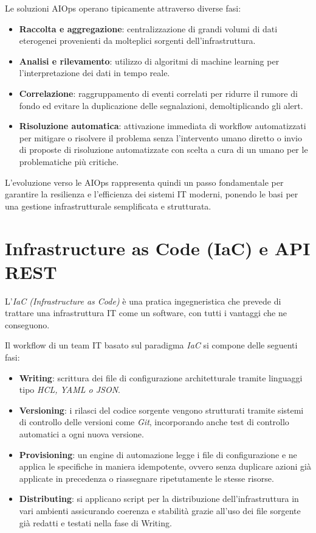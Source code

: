 Le soluzioni AIOps operano tipicamente attraverso diverse fasi:
\begin{itemize}
    \item \textbf{Raccolta e aggregazione}: centralizzazione di grandi volumi di dati eterogenei provenienti da molteplici sorgenti dell'infrastruttura.
    \item \textbf{Analisi e rilevamento}: utilizzo di algoritmi di machine learning per l'interpretazione dei dati in tempo reale.
    \item \textbf{Correlazione}: raggruppamento di eventi correlati per ridurre il rumore di fondo ed evitare la duplicazione delle segnalazioni, demoltiplicando gli alert.
    \item \textbf{Risoluzione automatica}: attivazione immediata di workflow automatizzati per mitigare o risolvere il problema senza l'intervento umano diretto o invio di proposte di risoluzione automatizzate con scelta a cura di un umano per le problematiche più critiche.
\end{itemize}

L'evoluzione verso le AIOps rappresenta quindi un passo fondamentale per garantire la resilienza e l'efficienza dei sistemi IT moderni, ponendo le basi per una gestione infrastrutturale semplificata e strutturata.

\section{Infrastructure as Code (IaC) e API REST}
L'\textit{IaC (Infrastructure as Code)} \cite{IBM_iac} è una pratica ingegneristica che prevede di trattare una infrastruttura IT come un software, con tutti i vantaggi che ne conseguono.

Il workflow di un team IT basato sul paradigma \textit{IaC} si compone delle seguenti fasi:
\begin{itemize}
    \item \textbf{Writing}: scrittura dei file di configurazione architetturale tramite linguaggi tipo \textit{HCL, YAML o JSON}.
    \item \textbf{Versioning}: i rilasci del codice sorgente vengono strutturati tramite sistemi di controllo delle versioni come \textit{Git}, incorporando anche test di controllo automatici a ogni nuova versione.
    \item \textbf{Provisioning}: un engine di automazione legge i file di configurazione e ne applica le specifiche in maniera idempotente, ovvero senza duplicare azioni già applicate in precedenza o riassegnare ripetutamente le stesse risorse.
    \item \textbf{Distributing}: si applicano script per la distribuzione dell'infrastruttura in vari ambienti assicurando coerenza e stabilità grazie all'uso dei file sorgente già redatti e testati nella fase di Writing.
\end{itemize}

